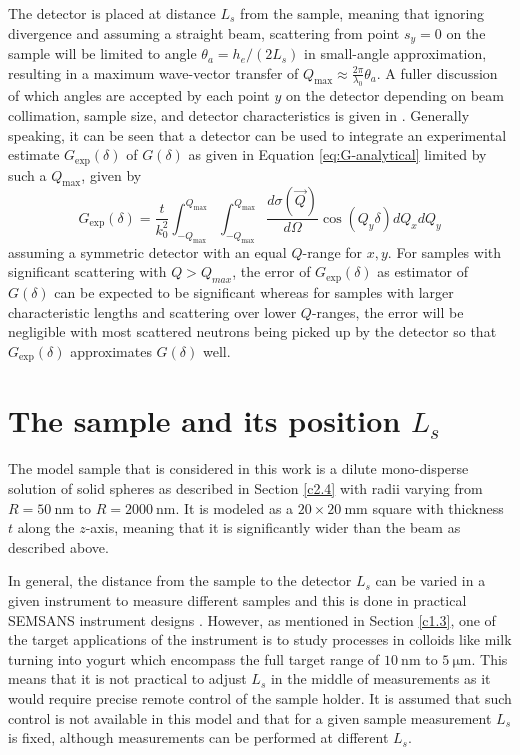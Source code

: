 The detector is placed at distance $L_s$ from the sample, meaning that ignoring divergence and assuming a straight beam, scattering from point $s_y = 0$ on the sample will be limited to angle $\theta_a = h_e/(2L_s)$ in small-angle approximation, resulting in a maximum wave-vector transfer of $Q_\text{max} \approx \frac{2\pi}{\lambda_0}\theta_a$. A fuller discussion of which angles are accepted by each point $y$ on the detector depending on beam collimation, sample size, and detector characteristics is given in \cite{kusmin2017}. Generally speaking, it can be seen that a detector can be used to integrate an experimental estimate $G_\text{exp}(\delta)$ of $G(\delta)$ as given in Equation \eqref{eq:G-analytical} limited by such a $Q_\text{max}$, given by 
\begin{equation}
	G_\text{exp}(\delta) = \frac{t}{k_0^2}\int_{-Q_\text{max}}^{Q_\text{max}}\int_{-Q_\text{max}}^{Q_\text{max}}\dfrac{d\sigma(\vec{Q})}{d\Omega}\cos(Q_y \delta)dQ_xdQ_y  \label{eq:G-experimental}
\end{equation}
assuming a symmetric detector with an equal $Q$-range for $x,y$. For samples with significant scattering with $Q > Q_{max}$, the error of $G_\text{exp}(\delta)$ as estimator of $G(\delta)$ can be expected to be significant whereas for samples with larger characteristic lengths and scattering over lower $Q$-ranges, the error will be negligible with most scattered neutrons being picked up by the detector \cite{rekveldt1996} so that $G_\text{exp}(\delta)$ approximates $G(\delta)$ well. 

\section{The sample and its position $L_s$}
\label{c3.5}
The model sample that is considered in this work is a dilute mono-disperse solution of solid spheres as described in Section \ref{c2.4} with radii varying from $R = \SI{50}{\nano\meter}$ to $R = \SI{2000}{\nano\meter}$. It is modeled as a $20\times20~\unit{\milli\meter}$ square with thickness $t$ along the $z$-axis, meaning that it is significantly wider than the beam as described above. 

In general, the distance from the sample to the detector $L_s$ can be varied in a given instrument to measure different samples and this is done in practical SEMSANS instrument designs \cite{kusmin2017}. However, as mentioned in Section \ref{c1.3}, one of the target applications of the instrument is to study processes in colloids like milk turning into yogurt which encompass the full target range of $\SI{10}{\nano\meter}$ to $\SI{5}{\micro\meter}$. This means that it is not practical to adjust $L_s$ in the middle of measurements as it would require precise remote control of the sample holder. It is assumed that such control is not available in this model and that for a given sample measurement $L_s$ is fixed, although measurements can be performed at different $L_s$.  


